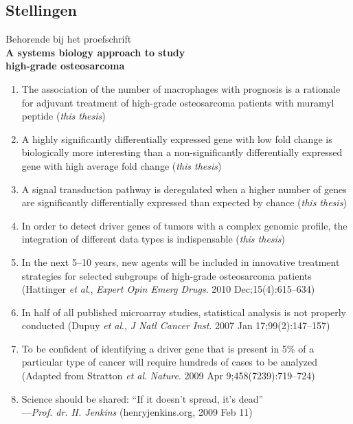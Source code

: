 \documentclass[11pt,b5paper]{article}
\begin{document}
\begin{flushleft}
\thispagestyle{empty}

\centering
	\section{Stellingen}
	\begin{large}
		Behorende bij het proefschrift\\
		\vspace{0.3cm}
		\bf{A systems biology approach to study \\ high-grade osteosarcoma}
		\vspace{0.8cm}
	\end{large}
\begin{enumerate}
	\item{The association of the number of macrophages with prognosis is a rationale for adjuvant treatment of high-grade osteosarcoma patients with muramyl peptide ({\it this thesis})}
	\item{A highly significantly differentially expressed gene with low fold change is biologically more interesting than a non-significantly differentially expressed gene with high average fold change ({\it this thesis})}
	\item{A signal transduction pathway is deregulated when a higher number of genes are  significantly differentially expressed than expected by chance ({\it this thesis})}
	\item{In order to detect driver genes of tumors with a complex genomic profile, the integration of different data types is indispensable ({\it this thesis})}
	\item{In the next 5--10 years, new agents will be included in innovative treatment strategies for selected subgroups of high-grade osteosarcoma patients (Hattinger {\it et al}., {\it Expert Opin Emerg Drugs}. 2010 Dec;15(4):615--634)}
	\item{In half of all published microarray studies, statistical analysis is not properly conducted (Dupuy {\it et al}., {\it J Natl Cancer Inst}. 2007 Jan 17;99(2):147--157)}
	\item{To be confident of identifying a driver gene that is present in 5\% of a particular type of cancer will require hundreds of cases to be analyzed (Adapted from Stratton {\it et al}. {\it Nature}. 2009 Apr 9;458(7239):719--724)}
	\item{Science should be shared: ``If it doesn't spread, it's dead''\\---{\it Prof. dr. H. Jenkins}} (henryjenkins.org, 2009 Feb 11)\\%

\end{enumerate}
\end{flushleft}
\end{document}
